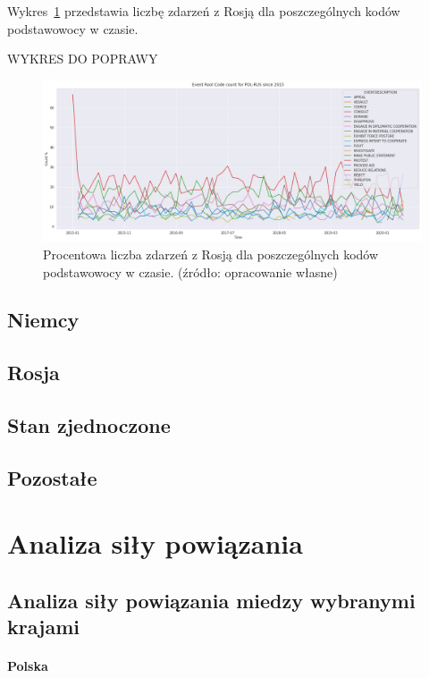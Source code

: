 \documentclass[11pt]{report}
\begin{document}
    Wykres~\ref{fig:PLRUSERC} przedstawia liczbę zdarzeń z Rosją dla poszczególnych kodów podstawowocy w czasie.

    WYKRES DO POPRAWY
    \begin{figure}[ht!]
        \centering
        \includegraphics[width=1 \textwidth]{fig/PL/POLRUSERCperc.png}
        \caption{Procentowa liczba zdarzeń z Rosją dla poszczególnych kodów podstawowocy w czasie. (źródło: opracowanie własne)}
        \label{fig:PLRUSERC}
    \end{figure}

    \subsection{Niemcy}

    \subsection{Rosja}

    \subsection{Stan zjednoczone}

    \subsection{Pozostałe}


    \section{Analiza siły powiązania}

    \subsection{Analiza siły powiązania miedzy wybranymi krajami}

    \paragraph{Polska}
\end{document}
